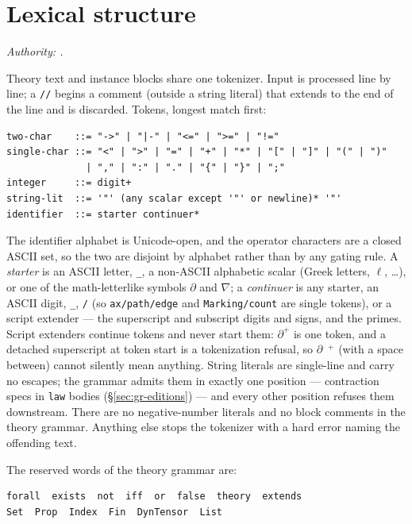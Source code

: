 \section{Lexical structure}
\label{sec:gr-lexical}

\emph{Authority: .}

Theory text and instance blocks share one tokenizer. Input is
processed line by line; a \texttt{//} begins a comment (outside a
string literal) that extends to the end of the line and is
discarded. Tokens, longest match first:

\begin{Verbatim}[fontsize=\small,frame=leftline,rulecolor=\color{accentmid},framesep=3mm,xleftmargin=3mm]
two-char    ::= "->" | "|-" | "<=" | ">=" | "!="
single-char ::= "<" | ">" | "=" | "+" | "*" | "[" | "]" | "(" | ")"
              | "," | ":" | "." | "{" | "}" | ";"
integer     ::= digit+
string-lit  ::= '"' (any scalar except '"' or newline)* '"'
identifier  ::= starter continuer*
\end{Verbatim}

\noindent The identifier alphabet is Unicode-open, and the operator
characters are a closed ASCII set, so the two are disjoint by
alphabet rather than by any gating rule. A \emph{starter} is an
ASCII letter, \texttt{\_}, a non-ASCII alphabetic scalar (Greek
letters, $\ell$, \ldots), or one of the math-letterlike symbols
$\partial$ and $\nabla$; a \emph{continuer} is any starter, an ASCII
digit, \texttt{\_}, \texttt{/} (so \texttt{ax/path/edge} and
\texttt{Marking/count} are single tokens), or a script extender ---
the superscript and subscript digits and signs, and the primes.
Script extenders continue tokens and never start them: $\partial^{+}$
is one token, and a detached superscript at token start is a
tokenization refusal, so $\partial$~$^{+}$ (with a space between)
cannot silently mean anything. String literals are single-line and carry no escapes; the
grammar admits them in exactly one position --- contraction specs in
\texttt{law} bodies (\S\ref{sec:gr-editions}) --- and every other
position refuses them downstream. There are no negative-number
literals and no block comments in the theory grammar. Anything else
stops the tokenizer with a hard error naming the offending text.

The reserved words of the theory grammar are:

\begin{Verbatim}[fontsize=\small,frame=leftline,rulecolor=\color{accentmid},framesep=3mm,xleftmargin=3mm]
forall  exists  not  iff  or  false  theory  extends
Set  Prop  Index  Fin  DynTensor  List
\end{Verbatim}

